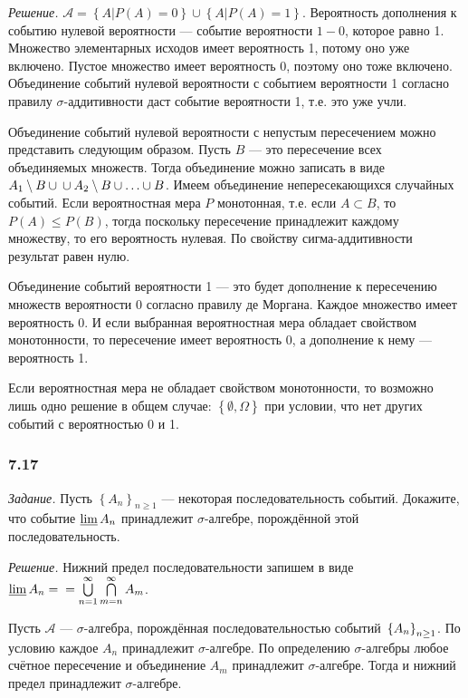\textit{Решение.} $ \mathcal{A} = \left\{ \left. A \right| P \left( A \right) = 0 \right\} \cup \left\{ \left. A \right| P \left( A \right) = 1 \right\} $.
Вероятность дополнения к событию нулевой вероятности --- событие вероятности $1 - 0$, которое равно 1.
Множество элементарных исходов имеет вероятность 1, потому оно уже включено.
Пустое множество имеет вероятность 0, поэтому оно тоже включено.
Объединение событий нулевой вероятности с событием вероятности 1 согласно правилу $ \sigma $-аддитивности даст событие вероятности 1, т.е. это уже учли.

Объединение событий нулевой вероятности с непустым пересечением можно представить следующим образом.
Пусть $B$ --- это пересечение всех объединяемых множеств.
Тогда объединение можно записать в виде $A_1 \setminus B \cup \\
\cup A_2 \setminus B \cup \dotsc \cup B$.
Имеем объединение непересекающихся случайных событий.
Если вероятностная мера $P$ монотонная,
т.е. если $A \subset B$, то $P \left( A \right) \leq P \left( B \right) $, тогда поскольку пересечение принадлежит каждому множеству, то его вероятность нулевая.
По свойству сигма-аддитивности результат равен нулю.

Объединение событий вероятности 1 --- это будет дополнение к пересечению множеств вероятности 0 согласно правилу де Моргана.
Каждое множество имеет вероятность 0.
И если выбранная вероятностная мера обладает свойством монотонности, то пересечение имеет вероятность 0, а дополнение к нему --- вероятность 1.

Если вероятностная мера не обладает свойством монотонности, то возможно лишь одно решение в общем случае:
$ \left\{ \emptyset, \Omega \right\} $ при условии, что нет других событий с вероятностью 0 и 1.

\subsubsection*{7.17}

\textit{Задание.} Пусть $ \left\{ A_n \right\}_{n \geq 1}$ --- некоторая последовательность событий.
Докажите, что событие $ \varliminf A_n$ принадлежит $ \sigma $-алгебре, порождённой этой последовательность.

\textit{Решение.} Нижний предел последовательности запишем в виде $ \varliminf A_n = \\
= \bigcup \limits_{n=1}^{ \infty } \bigcap \limits_{m=n}^{ \infty } A_m$.

Пусть $ \mathcal{A}$ --- $ \sigma $-алгебра, порождённая последовательностью событий $ \\
\left\{ A_n \right\}_{n \geq 1}$.
По условию каждое $A_n$ принадлежит $ \sigma $-алгебре.
По определению $ \sigma $-алгебры любое счётное пересечение и объединение $A_m$ принадлежит $ \sigma $-алгебре.
Тогда и нижний предел принадлежит $ \sigma $-алгебре.
